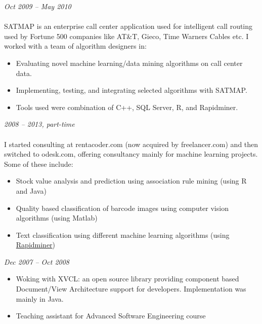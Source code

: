 \documentclass[margin, 10pt]{res} %
\begin{document}
\begin{resume}
{\sl {}} \hfill \textit{Oct 2009 -- May 2010} \\
{\href{http://www.satmapinc.com/}{\color{RubineRed}{SATMAP Inc, Machine Learning Team, Pakistan}}}  \\
SATMAP is an enterprise call center application used for intelligent call routing used by Fortune 500 companies like AT\&T, Gieco, Time Warners Cables etc. I worked with a team of algorithm designers in:

\begin{itemize} \itemsep -2pt %
\item Evaluating novel machine learning/data mining algorithms on call center data. 
\item Implementing, testing, and integrating selected algorithms with SATMAP. 
\item Tools used were combination of C++, SQL Server, R, and Rapidminer.
\end{itemize}

{\sl \textbf{}} \hfill \textit{2008 -- 2013, part-time} \\
{\color{RubineRed}{Upwork (formerly Odesk)} } \\
I started consulting at rentacoder.com (now acquired by freelancer.com) and then switched to odesk.com, offering consultancy mainly for machine learning projects. Some of these include: 
\begin{itemize} \itemsep -2pt %
\item Stock value analysis and prediction using association rule mining (using R and Java)
\item Quality based classification of barcode images using computer vision algorithms (using Matlab)
\item Text classification using different machine learning algorithms (using \href{https://rapidminer.com/}{Rapidminer}) 
\end{itemize} 

 
{\sl \textbf{}} \hfill \textit{Dec 2007 -- Oct 2008} \\
{\color{RubineRed}{Computer Science Department, LUMS, Pakistan}} 
\begin{itemize} 
\item Woking with XVCL: an open source library providing component based Document/View Architecture support for developers. Implementation was mainly in Java.
\item Teaching assistant for Advanced Software Engineering course
\end{itemize} 


\end{resume}
\end{document}
